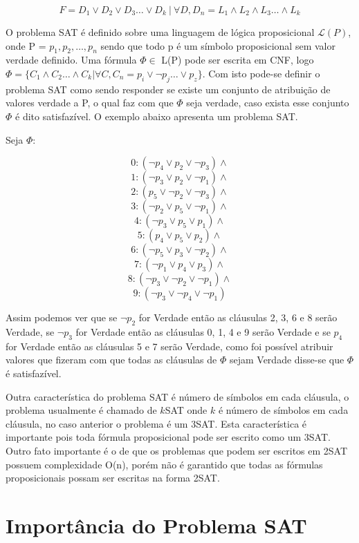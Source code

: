\documentclass{ufsc-thesis}
\begin{document}
\begin{equation} \label{eq:DNF}
F = D_1\vee D_2\vee D_3 \dots \vee D_k\ |\ \forall D, D_n = L_1\wedge L_2 \wedge L_3 \dots \wedge L_k
\end{equation}

O problema SAT é definido sobre uma linguagem de lógica proposicional $\mathcal{L}(P)$, 
onde P = {$p_1,p_2,\dots,p_n$} sendo que todo p é um símbolo proposicional sem 
valor verdade definido. Uma fórmula $\Phi \in$ L(P) pode ser escrita em CNF, 
logo $\Phi = \{C_1\wedge C_2 \dots \wedge C_k | \forall C, C_n = p_i \vee \neg p_j \dots \vee p_z\}$.
Com isto pode-se definir o problema SAT como sendo responder se existe um 
conjunto de atribuição de valores verdade a P, o qual faz com que $\Phi$ 
seja verdade, caso exista esse conjunto $\Phi$ é dito satisfazível. O exemplo 
abaixo apresenta um problema SAT.

Seja $\Phi$:

$$0: (\neg p_4\vee p_2 \vee\neg p_3) \wedge $$
$$1: (\neg p_3\vee p_2 \vee\neg p_1) \wedge $$
$$2: ( p_5\vee\neg p_2 \vee\neg p_3) \wedge $$
$$3: (\neg p_2\vee p_5 \vee\neg p_1) \wedge $$
$$4: (\neg p_3\vee p_5 \vee p_1) \wedge $$
$$5: ( p_4\vee p_5 \vee p_2) \wedge $$
$$6: (\neg p_5\vee p_3 \vee\neg p_2) \wedge $$
$$7: (\neg p_1\vee p_4 \vee p_3) \wedge $$
$$8: (\neg p_3\vee\neg p_2 \vee\neg p_1) \wedge $$
$$9: (\neg p_3\vee\neg p_4 \vee\neg p_1) $$

Assim podemos ver que se $\neg p_2$ for Verdade então as cláusulas
2, 3, 6 e 8 serão Verdade, se $\neg p_3$ for Verdade então as cláusulas 
0, 1, 4 e 9 serão Verdade e se $p_4$ for Verdade então as cláusulas 
5 e 7 serão Verdade, como foi possível atribuir valores que fizeram com 
que todas as cláusulas de $\Phi$ sejam Verdade disse-se que $\Phi$ é satisfazível.

Outra característica do problema SAT é número de símbolos em cada cláusula,
o problema usualmente é chamado de $k$SAT onde $k$ é número de símbolos em cada 
cláusula, no caso anterior o problema é um 3SAT. Esta característica 
é importante pois toda fórmula proposicional pode ser escrito como um 3SAT. 
Outro fato importante é o de que os problemas que podem ser escritos em 
2SAT possuem complexidade O(n), porém não é garantido que todas as fórmulas proposicionais 
possam ser escritas na forma 2SAT\cite{Biere}.

\section{Importância do Problema SAT}
\label{sec:ipsat}
\end{document}
